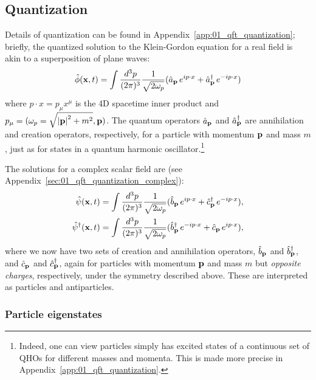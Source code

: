 \subsection{Quantization}
\label{sec:01_qft_fsft_quantization}

Details of quantization can be found in Appendix~\ref{app:01_qft_quantization}; briefly, the quantized solution to the Klein-Gordon equation for a real field is akin to a superposition of plane waves:
\begin{equation}
	\label{eq:01_qft_fsft_quantization_fsf_fields}
    \hat\phi(\mathbf{x}, t) = \int \frac{d^3p}{(2\pi)^3} \frac{1}{\sqrt{2\omega_p}} (\hat a_{\mathbf{p}}\,e^{ip\cdot x} + \hat a^\dagger_{\mathbf{p}}\, e^{-ip\cdot x})
\end{equation}
where $p \cdot x = p_\mu x^\mu$ is the 4D spacetime inner product and $p_\mu = (\omega_p = \sqrt{\left\lvert \mathbf{p} \right\rvert^2 + m^2}, \mathbf{p})$.
The quantum operators $\hat a_{\mathbf{p}}$ and $\hat a^\dagger_{\mathbf{p}}$ are annihilation and creation operators, respectively, for a particle with momentum $\mathbf{p}$ and mass $m$, just as for states in a quantum harmonic oscillator.\footnote{Indeed, one can view particles simply has excited states of a continuous set of QHOs for different masses and momenta. This is made more precise in Appendix~\ref{app:01_qft_quantization}.}

The solutions for a complex scalar field are (see Appendix~\ref{sec:01_qft_quantization_complex}):
\begin{equation}
    \label{eq:01_qft_fsft_quantization_complex_fields}
    \begin{split}
        \hat\psi(\mathbf{x}, t) &= \int \frac{d^3p}{(2\pi)^3} \frac{1}{\sqrt{2\omega_p}} (\hat b_{\mathbf{p}}\,e^{ip\cdot x} + \hat c^\dagger_{\mathbf{p}}\, e^{-ip\cdot x}), \\
        \hat\psi^\dagger(\mathbf{x}, t) &= \int \frac{d^3p}{(2\pi)^3} \frac{1}{\sqrt{2\omega_p}} (\hat b^\dagger_{\mathbf{p}}\,e^{-ip\cdot x} + \hat c_{\mathbf{p}}\, e^{ip\cdot x}),
    \end{split}
\end{equation}
where we now have two sets of creation and annihilation operators, $\hat b_{\mathbf{p}}$ and $\hat b^\dagger_{\mathbf{p}}$, and $\hat c_{\mathbf{p}}$ and $\hat c^\dagger_{\mathbf{p}}$, again for particles with momentum $\mathbf{p}$ and mass $m$ but \textit{opposite charges}, respectively, under the \UU[1] symmetry described above.
These are interpreted as particles and antiparticles.

\subsubsection{Particle eigenstates}

